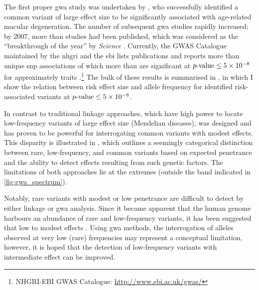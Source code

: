 %

%

The first proper \gls{gwa} study was undertaken by \citet{Klein:2005dn}, who successfully identified a common variant of large effect size to be significantly associated with age-related macular degeneration.
The number of subsequent \gls{gwa} studies rapidly increased; by 2007, more than  studies had been published, which was considered as the ``breakthrough of the year'' by \textsl{Science} \citep{Pennisi:2007cs}.
Currently, the GWAS Catalogue maintained by the \gls{nhgri} and the \gls{ebi} lists  publications and reports more than  unique \gls{snp} associations of which more than  are significant at ${\mbox{$p$-value}\leq\num{5e-8}}$ for approximately  traits \citep{burdett2016nhgri}.\footnote{NHGRI-EBI GWAS Catalogue: \url{http://www.ebi.ac.uk/gwas/} }
The bulk of these results is summarised in , in which I show the relation between risk effect size and allele frequency for identified risk-associated variants at ${\mbox{$p$-value}\leq\num{5e-8}}$.

%

%

In contrast to traditional linkage approaches, which have high power to locate low-frequency variants of large effect size (\eg Mendelian diseases),  was designed and has proven to be powerful for interrogating common variants with modest effects.
This disparity is illustrated in , which outlines a seemingly categorical distinction between rare, low-frequency, and common variants based on expected penetrance and the ability to detect effects resulting from such genetic factors.
The limitations of both approaches lie at the extremes (outside the band indicated in \cref{fig:gwa_spectrum}).

Notably, rare variants with modest or low penetrance are difficult to detect by either linkage or \gls{gwa} analysis.
Since it became apparent that the human genome harbours an abundance of rare and low-frequency variants, it has been suggested that  low to modest effects \citep{Coventry:2010cqa,Keinan:2012kl,Tennessen:2012ck}.
Using \gls{gwa} methods, the interrogation of alleles observed at very low (rare) frequencies may represent a conceptual limitation, however, it is hoped that the detection of low-frequency variants with intermediate effect can be improved.


